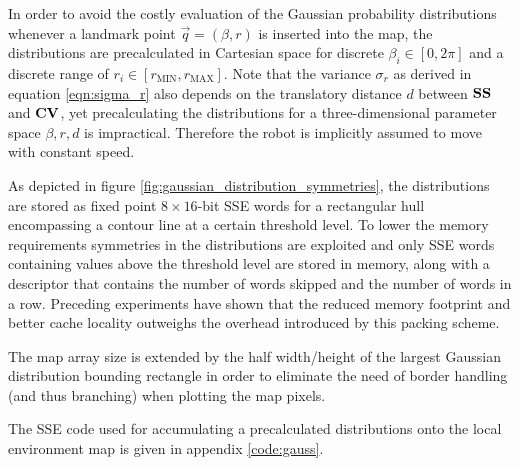 In order to avoid the costly evaluation of the Gaussian probability distributions whenever a landmark point $\vec q = (\beta, r)$ is inserted into the map, the distributions are precalculated in Cartesian space for discrete $\beta_i \in [0, 2\pi]$ and a discrete range of $r_i \in [r_{\mathrm{MIN}}, r_{\mathrm{MAX}}]$. Note that the variance $\sigma_r$ as derived in equation \ref{eqn:sigma_r} also depends on the translatory distance $d$ between $\mathbf{SS}$ and $\mathbf{CV}$, yet precalculating the distributions for a three-dimensional parameter space $\beta, r, d$ is impractical. Therefore the robot is implicitly assumed to move with constant speed.

As depicted in figure \ref{fig:gaussian_distribution_symmetries}, the distributions are stored as fixed point $8 \times 16$-bit SSE words for a rectangular hull encompassing a contour line at a certain threshold level. To lower the memory requirements symmetries in the distributions are exploited and only SSE words containing values above the threshold level are stored in memory, along with a descriptor that contains the number of words skipped and the number of words in a row. Preceding experiments have shown that the reduced memory footprint and better cache locality outweighs the overhead introduced by this packing scheme.

The map array size is extended by the half width/height of the largest Gaussian distribution bounding rectangle in order to eliminate the need of border handling (and thus branching) when plotting the map pixels.

The SSE code used for accumulating a precalculated distributions onto the local environment map is given in appendix \ref{code:gauss}.

